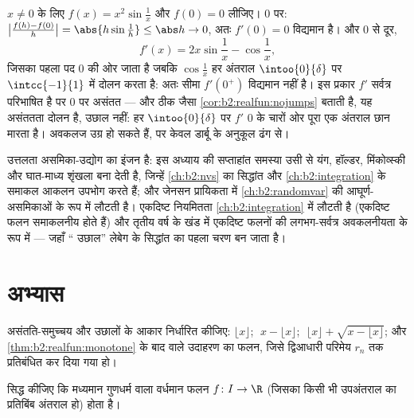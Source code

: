 \begin{example}\label{ex:b2:realfun:oscillation}
$x \neq 0$ के लिए $f(x) = x^2\sin\frac1x$ और $f(0) = 0$ लीजिए। $0$ पर: $\bigl|\frac{f(h) - f(0)}{h}\bigr| = \abs{h\sin\frac1h}
\leq \abs h \to 0$, अतः $f'(0) = 0$ विद्यमान है। और $0$
से दूर,
\[
f'(x) = 2x\sin\frac1x - \cos\frac1x ,
\]
जिसका पहला पद $0$ की ओर जाता है जबकि $\cos\frac1x$ हर अंतराल $\intoo{0}{\delta}$ पर $\intcc{-1}{1}$ में
दोलन करता है: अतः सीमा $f'(0^+)$ विद्यमान नहीं है। इस प्रकार $f'$ सर्वत्र
परिभाषित है पर $0$ पर असंतत --- और ठीक जैसा \cref{cor:b2:realfun:nojumps} बताती है, यह असंततता
दोलन है, उछाल नहीं: हर $\intoo{0}{\delta}$ पर $f'$ $0$ के चारों ओर पूरा एक अंतराल छान
मारता है। अवकलज उग्र हो सकते हैं, पर केवल डार्बू के अनुकूल ढंग से।
\end{example}

\begin{remark}[यह अध्याय कहाँ काम आता है]
उत्तलता असमिका-उद्योग का इंजन है: इस अध्याय की सप्ताहांत समस्या उसी से
यंग, हॉल्डर, मिंकोव्स्की और घात-माध्य शृंखला बना देती है, जिन्हें \cref{ch:b2:nvs} का
 सिद्धांत और \cref{ch:b2:integration} के समाकल आकलन उपभोग करते हैं; और जेनसन प्रायिकता
में \cref{ch:b2:randomvar} की आघूर्ण-असमिकाओं के रूप में लौटती है। एकदिष्ट नियमितता \cref{ch:b2:integration} में
लौटती है (एकदिष्ट फलन समाकलनीय होते हैं) और तृतीय वर्ष के खंड में
एकदिष्ट फलनों की लगभग-सर्वत्र अवकलनीयता के रूप में --- जहाँ ``
उछाल'' लेबेग के सिद्धांत का पहला चरण बन जाता है।
\end{remark}

\section{अभ्यास}

\begin{exercise}[$\star$]\label{exo:b2:realfun:1}
असंतति-समुच्चय और उछालों के आकार निर्धारित कीजिए: $\lfloor x
\rfloor$; $\;x - \lfloor x\rfloor$; $\;\lfloor x \rfloor + \sqrt{x
- \lfloor x\rfloor}$; और \cref{thm:b2:realfun:monotone}
के बाद वाले उदाहरण का फलन, जिसे द्विआधारी परिमेय $r_n$ तक प्रतिबंधित कर
दिया गया हो।
\end{exercise}

\begin{exercise}[$\star$]\label{exo:b2:realfun:2}
सिद्ध कीजिए कि मध्यमान गुणधर्म वाला वर्धमान फलन $f \colon I \to \R$ (जिसका किसी भी
उपअंतराल का प्रतिबिंब अंतराल हो)  होता है।
\end{exercise}

